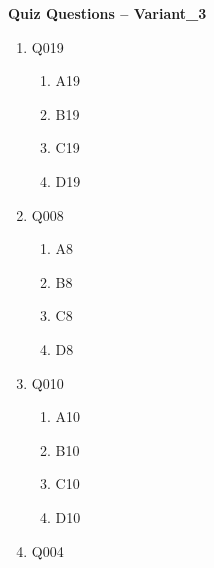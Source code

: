 \documentclass[12pt]{article}
\begin{document}
\begin{center}
    \Large\textbf{Quiz Questions -- Variant\_3}
\end{center}

\begin{enumerate}

    \item Q019
    \begin{enumerate}[label=(\Alph*)]
        
        \item A19
        
        \item B19
        
        \item C19
        
        \item D19
        
    \end{enumerate}

    \item Q008
    \begin{enumerate}[label=(\Alph*)]
        
        \item A8
        
        \item B8
        
        \item C8
        
        \item D8
        
    \end{enumerate}

    \item Q010
    \begin{enumerate}[label=(\Alph*)]
        
        \item A10
        
        \item B10
        
        \item C10
        
        \item D10
        
    \end{enumerate}

    \item Q004
    \begin{enumerate}[label=(\Alph*)]
        

\end{enumerate}
\end{enumerate}
\end{document}
